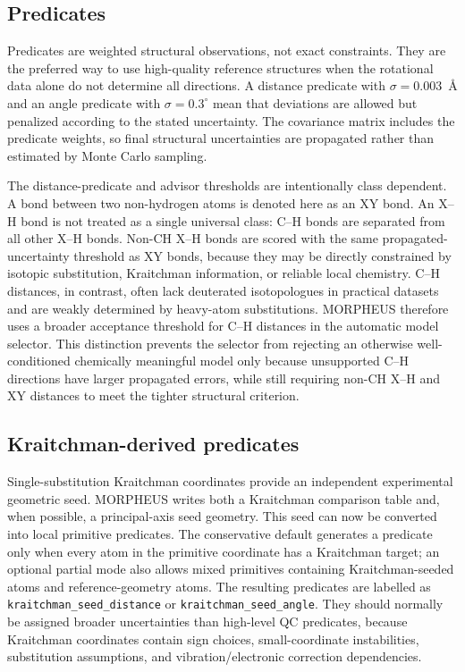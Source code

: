 \documentclass[11pt]{article}
\begin{document}
\subsection{Predicates}
Predicates are weighted structural observations, not exact constraints.  They are the
preferred way to use high-quality reference structures when the rotational data alone
do not determine all directions.  A distance predicate with $\sigma=0.003$~\AA{} and
an angle predicate with $\sigma=0.3^\circ$ mean that deviations are allowed but penalized
according to the stated uncertainty.  The covariance matrix includes the predicate
weights, so final structural uncertainties are propagated rather than estimated by
Monte Carlo sampling.

The distance-predicate and advisor thresholds are intentionally class dependent.  A
bond between two non-hydrogen atoms is denoted here as an XY bond.  An X--H bond is
not treated as a single universal class: C--H bonds are separated from all other X--H
bonds.  Non-CH X--H bonds are scored with the same propagated-uncertainty threshold
as XY bonds, because they may be directly constrained by isotopic substitution,
Kraitchman information, or reliable local chemistry.  C--H distances, in contrast,
often lack deuterated isotopologues in practical datasets and are weakly determined
by heavy-atom substitutions.  MORPHEUS therefore uses a broader acceptance threshold
for C--H distances in the automatic model selector.  This distinction prevents the
selector from rejecting an otherwise well-conditioned chemically meaningful model
only because unsupported C--H directions have larger propagated errors, while still
requiring non-CH X--H and XY distances to meet the tighter structural criterion.

\subsection{Kraitchman-derived predicates}
Single-substitution Kraitchman coordinates provide an independent experimental
geometric seed.  MORPHEUS writes both a Kraitchman comparison table and, when possible,
a principal-axis seed geometry.  This seed can now be converted into local primitive
predicates.  The conservative default generates a predicate only when every atom in
the primitive coordinate has a Kraitchman target; an optional partial mode also allows
mixed primitives containing Kraitchman-seeded atoms and reference-geometry atoms.  The
resulting predicates are labelled as \texttt{kraitchman\_seed\_distance} or
\texttt{kraitchman\_seed\_angle}.  They should normally be assigned broader uncertainties
than high-level QC predicates, because Kraitchman coordinates contain sign choices,
small-coordinate instabilities, substitution assumptions, and vibration/electronic
correction dependencies.
\end{document}
